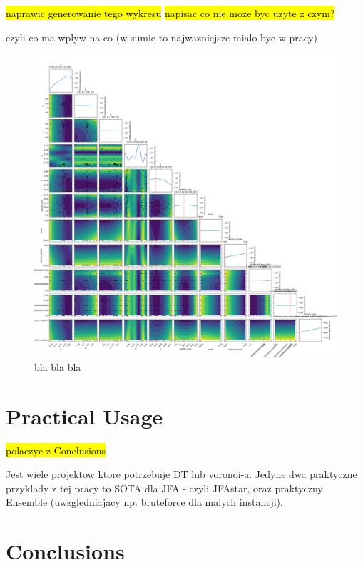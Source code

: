 \documentclass[format=acmsmall,screen,review,authordraft,nonacm]{acmart}
\begin{document}
\hl{naprawic generowanie tego wykresu}
\hl{napisac co nie moze byc uzyte z czym?}

czyli co ma wplyw na co (w sumie to najwazniejsze mialo byc w pracy)

\begin{figure}[H]
	\centering
	\includegraphics[width=\linewidth]{../figures/raport}
	\caption{bla bla bla}
	\label{fig:abstract}
\end{figure}

\section{Practical Usage} %

\hl{polaczyc z Conclusions}

Jest wiele projektow ktore potrzebuje DT lub voronoi-a. Jedyne dwa praktyczne
przyklady z tej pracy to SOTA dla JFA - czyli JFAstar, oraz praktyczny Ensemble
(uwzgledniajacy np. bruteforce dla malych instancji).

\section{Conclusions} %
\end{document}
